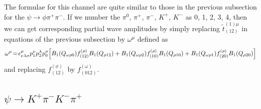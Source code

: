 The formulae for this channel are quite similar to those in the
previous subsection for the $\psi\to\phi\pi^+\pi^-$. If we number
the $\pi^0$, $\pi^+$, $\pi^-$, $K^+$, $K^-$ as 0, 1, 2, 3, 4, then
we can get corresponding partial wave amplitudes by simply
replacing $\tilde t^{(1)\mu}_{(12)}$ in equations of the previous
subsection by $\omega^\mu$ defined as
\begin{equation}
\omega^\mu \!=\! \epsilon^\mu_{\nu\lambda\sigma}p_1^\nu p_2^\lambda p_0^\sigma
\Bigl[B_1(Q_{\omega\rho 0}) f^{(\rho)}_{(12)}B_1(Q_{\rho 12}) +
B_1(Q_{\omega\rho 2}) f^{(\rho)}_{(10)} B_1(Q_{\rho 10}) +
B_1(Q_{\omega\rho 1}) f^{(\rho)}_{(20)} B_1(Q_{\rho 20})\Bigr]
\end{equation}
and replacing $f_{(12)}^{(\phi)}$ by $f_{(012)}^{(\omega)}$.

\subsection{$\psi\to K^+\pi^-K^-\pi^+$}

